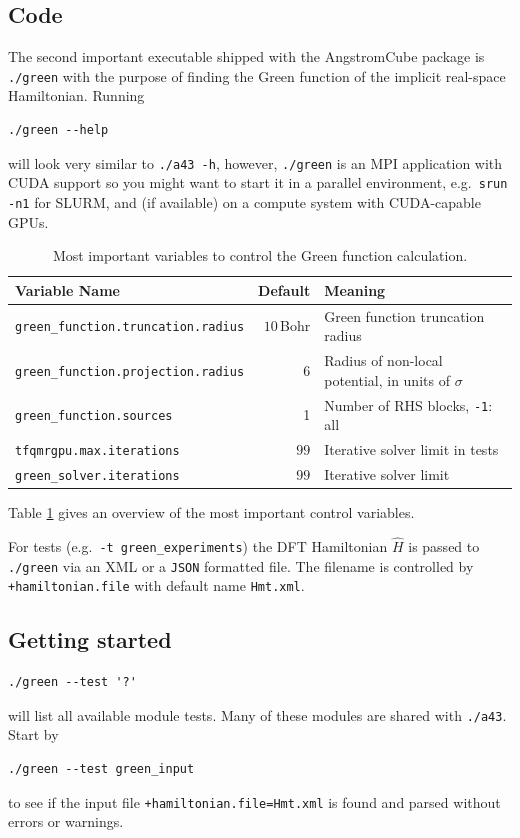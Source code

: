 \documentclass[oribibl]{llncs}
\newcommand{\ttt}[1]{\texttt{#1}}
\newcommand{\fullcodename}{AngstromCube}
\begin{document}
\subsection{Code}
The second important executable shipped with the \fullcodename{} package is \ttt{./green}
with the purpose of finding the Green function of the implicit real-space Hamiltonian. Running
\begin{verbatim}
./green --help
\end{verbatim}
will look very similar to \ttt{./a43 -h}, however, \ttt{./green} is an \ac{MPI} application
with CUDA support so you might want to start it in a parallel environment, e.g.~\ttt{srun -n1} for SLURM,
and (if available) on a compute system with CUDA-capable \ac{GPU}s.

%
\begin{table}[h]
\caption[Main Variables]{
Most important variables to control the Green function calculation.
} \label{tab:main-green-variables}
\centering
\begin{tabular}{|l|r|l|}
\hline
  Variable Name & Default & Meaning \\
\hline
  \ttt{green\_function.truncation.radius} & $10\,$Bohr   & Green function truncation radius \\
  \ttt{green\_function.projection.radius} & $6$          & Radius of non-local potential, in units of $\sigma$ \\
  \ttt{green\_function.sources}			  & 1            & Number of \ac{RHS} blocks, \ttt{-1}: all \\
  \ttt{tfqmrgpu.max.iterations}           & $99$         & Iterative solver limit in tests \\
  \ttt{green\_solver.iterations}          & $99$         & Iterative solver limit \\
\hline
\end{tabular}
\end{table}
%
\noindent
Table \ref{tab:main-green-variables} gives an overview of the most important control variables.

\noindent
For tests (e.g.~\ttt{-t green\_experiments})
the \ac{DFT} Hamiltonian $\hat H$ is passed to \ttt{./green} via an \ac{XML} or a \ttt{JSON} formatted file.
The filename is controlled by \ttt{+hamiltonian.file} with default name \ttt{Hmt.xml}.

\subsection{Getting started} \label{sec:green-getting-started}
%
\begin{verbatim}
./green --test '?'
\end{verbatim}
will list all available module tests. Many of these modules are shared with \ttt{./a43}.
Start by
\begin{verbatim}
./green --test green_input
\end{verbatim}
to see if the input file \ttt{+hamiltonian.file=Hmt.xml} is found and parsed without errors or warnings.
\end{document}
